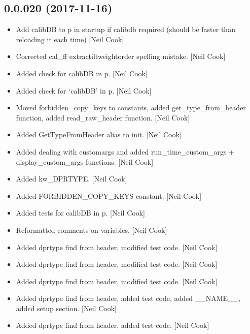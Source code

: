 \documentclass[a4paper,10pt,english]{report}
\begin{document}
\subsection{0.0.020 (2017-11-16)}
\label{\detokenize{misc/changelog:id529}}\begin{itemize}
\item {} 
Add calibDB to p in startup if calibdb required (should be faster than
reloading it each time) {[}Neil Cook{]}

\item {} 
Corrected cal\_ff extractiltweightorder spelling mistake. {[}Neil Cook{]}

\item {} 
Added check for calibDB in p. {[}Neil Cook{]}

\item {} 
Added check for ‘calibDB’ in p. {[}Neil Cook{]}

\item {} 
Moved forbidden\_copy\_keys to constants, added get\_type\_from\_header
function, added read\_raw\_header function. {[}Neil Cook{]}

\item {} 
Added GetTypeFromHeader alias to init. {[}Neil Cook{]}

\item {} 
Added dealing with customargs and added run\_time\_custom\_args +
display\_custom\_args functions. {[}Neil Cook{]}

\item {} 
Added kw\_DPRTYPE. {[}Neil Cook{]}

\item {} 
Added FORBIDDEN\_COPY\_KEYS constant. {[}Neil Cook{]}

\item {} 
Added tests for calibDB in p. {[}Neil Cook{]}

\item {} 
Reformatted comments on variables. {[}Neil Cook{]}

\item {} 
Added dprtype find from header, modified test code. {[}Neil Cook{]}

\item {} 
Added dprtype find from header, modified test code. {[}Neil Cook{]}

\item {} 
Added dprtype find from header, modified test code. {[}Neil Cook{]}

\item {} 
Added dprtype find from header, added test code, added \_\_NAME\_\_, added
setup section. {[}Neil Cook{]}

\item {} 
Added dprtype find from header, added test code. {[}Neil Cook{]}

\end{itemize}
\end{document}
